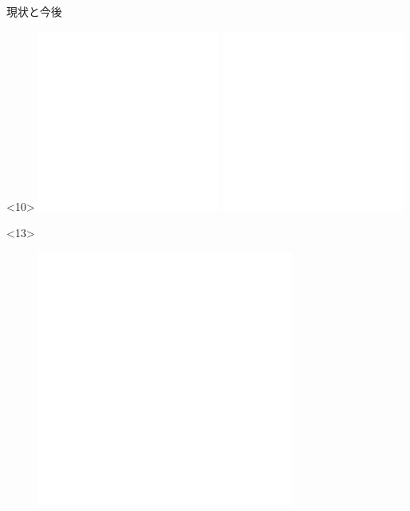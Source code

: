 \documentclass[cjk,dvipdfmx,14pt,compress,fragile]{beamer}
\begin{document}
\begin{frame}[c,fragile]{現状と今後}
  \begin{onlyenv}<10>
    \includegraphics[width=0.45\textwidth]{image201701/blank.png}
    \includegraphics[width=0.45\textwidth]{image201701/blank.png}
  \end{onlyenv}
  \begin{onlyenv}<13>
    \begin{figure}
      \centering
      \includegraphics[width=0.75\textwidth]{image201701/blank.png}
    \end{figure}

\end{onlyenv}
\end{frame}
\end{document}
